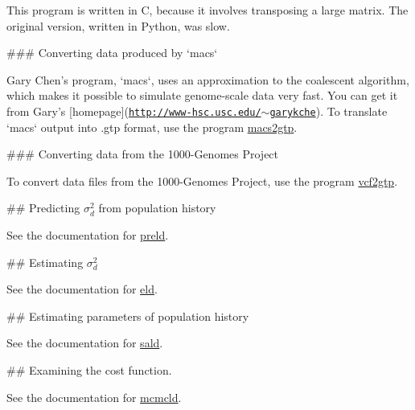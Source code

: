 \-This program is written in \-C, because it involves transposing a large matrix. \-The original version, written in \-Python, was slow.

\#\#\# \-Converting data produced by `macs`

\-Gary \-Chen's program, `macs`, uses an approximation to the coalescent algorithm, which makes it possible to simulate genome-\/scale data very fast. \-You can get it from \-Gary's \mbox{[}homepage\mbox{]}(\href{http://www-hsc.usc.edu/~garykche}{\tt http\-://www-\/hsc.\-usc.\-edu/$\sim$garykche}). \-To translate `macs` output into .gtp format, use the program \hyperlink{macs2gtp}{macs2gtp}.

\#\#\# \-Converting data from the 1000-\/\-Genomes \-Project

\-To convert data files from the 1000-\/\-Genomes \-Project, use the program \hyperlink{vcf2gtp}{vcf2gtp}.

\#\# \-Predicting $\sigma_d^2$ from population history

\-See the documentation for \hyperlink{preld}{preld}.

\#\# \-Estimating $\sigma_d^2$

\-See the documentation for \hyperlink{eld}{eld}.

\#\# \-Estimating parameters of population history

\-See the documentation for \hyperlink{sald}{sald}.

\#\# \-Examining the cost function.

\-See the documentation for \hyperlink{mcmcld}{mcmcld}. 